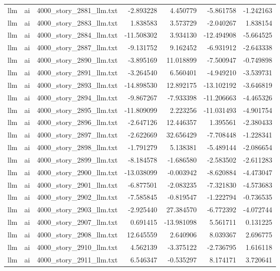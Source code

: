 \begin{longtable}{lllrrrr}
llm & ai & 4000\_story\_2881\_llm.txt & -2.893228 & 4.450779 & -5.861758 & -1.242163 \\
llm & ai & 4000\_story\_2883\_llm.txt & 1.838583 & 3.573729 & -2.040267 & 1.838154 \\
llm & ai & 4000\_story\_2884\_llm.txt & -11.508302 & 3.934130 & -12.494908 & -5.664525 \\
llm & ai & 4000\_story\_2887\_llm.txt & -9.131752 & 9.162452 & -6.931912 & -2.643338 \\
llm & ai & 4000\_story\_2890\_llm.txt & -3.895169 & 11.018899 & -7.500947 & -0.749898 \\
llm & ai & 4000\_story\_2891\_llm.txt & -3.264540 & 6.560401 & -4.949210 & -3.539731 \\
llm & ai & 4000\_story\_2893\_llm.txt & -14.898530 & 12.892175 & -13.102192 & -3.646819 \\
llm & ai & 4000\_story\_2894\_llm.txt & -9.867267 & -7.933398 & -11.206663 & -4.465326 \\
llm & ai & 4000\_story\_2895\_llm.txt & -11.809099 & 2.223256 & -11.031493 & -4.901754 \\
llm & ai & 4000\_story\_2896\_llm.txt & -2.647126 & 12.446357 & 1.395561 & -2.380433 \\
llm & ai & 4000\_story\_2897\_llm.txt & -2.622669 & 32.656429 & -7.708448 & -1.228341 \\
llm & ai & 4000\_story\_2898\_llm.txt & -1.791279 & 5.138381 & -5.489144 & -2.086654 \\
llm & ai & 4000\_story\_2899\_llm.txt & -8.184578 & -1.686580 & -2.583502 & -2.611283 \\
llm & ai & 4000\_story\_2900\_llm.txt & -13.038099 & -0.003942 & -8.620884 & -4.473047 \\
llm & ai & 4000\_story\_2901\_llm.txt & -6.877501 & -2.083235 & -7.321830 & -4.573683 \\
llm & ai & 4000\_story\_2902\_llm.txt & -7.585845 & -0.819547 & -1.222794 & -0.736535 \\
llm & ai & 4000\_story\_2903\_llm.txt & -2.925440 & 27.384570 & -6.772392 & -4.072744 \\
llm & ai & 4000\_story\_2907\_llm.txt & 0.691415 & -13.981098 & 5.561711 & 0.131225 \\
llm & ai & 4000\_story\_2908\_llm.txt & 12.645559 & 2.640906 & 8.039367 & 2.696775 \\
llm & ai & 4000\_story\_2910\_llm.txt & 4.562139 & -3.375122 & -2.736795 & 1.616118 \\
llm & ai & 4000\_story\_2911\_llm.txt & 6.546347 & -0.535297 & 8.174171 & 3.720641 \\

\end{longtable}
